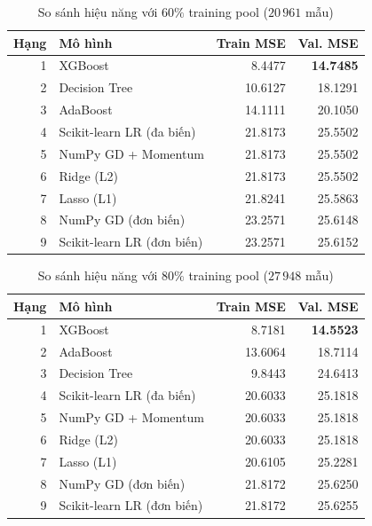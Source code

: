 
\begin{table}[H]
    \centering
    \caption{So sánh hiệu năng với $60\%$ training pool ($20\,961$ mẫu)}
    \label{tab:lc-60}
    \small
    \begin{tabular}{r p{} rr}
        \toprule
        \textbf{Hạng} & \textbf{Mô hình} & \textbf{Train MSE}
        & \textbf{Val. MSE} \\
        \midrule
        1 & XGBoost & 8.4477 & \textbf{14.7485} \\
        2 & Decision Tree & 10.6127 & 18.1291 \\
        3 & AdaBoost & 14.1111 & 20.1050 \\
        4 & Scikit-learn LR (đa biến) & 21.8173 & 25.5502 \\
        5 & NumPy GD + Momentum & 21.8173 & 25.5502 \\
        6 & Ridge (L2) & 21.8173 & 25.5502 \\
        7 & Lasso (L1) & 21.8241 & 25.5863 \\
        8 & NumPy GD (đơn biến) & 23.2571 & 25.6148 \\
        9 & Scikit-learn LR (đơn biến) & 23.2571 & 25.6152 \\
        \bottomrule
    \end{tabular}
\end{table}


\begin{table}[H]
    \centering
    \caption{So sánh hiệu năng với $80\%$ training pool ($27\,948$ mẫu)}
    \label{tab:lc-80}
    \small
    \begin{tabular}{r p{} rr}
        \toprule
        \textbf{Hạng} & \textbf{Mô hình} & \textbf{Train MSE}
        & \textbf{Val. MSE} \\
        \midrule
        1 & XGBoost & 8.7181 & \textbf{14.5523} \\
        2 & AdaBoost & 13.6064 & 18.7114 \\
        3 & Decision Tree & 9.8443 & 24.6413 \\
        4 & Scikit-learn LR (đa biến) & 20.6033 & 25.1818 \\
        5 & NumPy GD + Momentum & 20.6033 & 25.1818 \\
        6 & Ridge (L2) & 20.6033 & 25.1818 \\
        7 & Lasso (L1) & 20.6105 & 25.2281 \\
        8 & NumPy GD (đơn biến) & 21.8172 & 25.6250 \\
        9 & Scikit-learn LR (đơn biến) & 21.8172 & 25.6255 \\
        \bottomrule
    \end{tabular}
\end{table}

